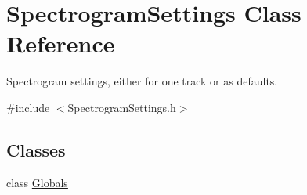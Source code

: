 \hypertarget{class_spectrogram_settings}{}\section{Spectrogram\+Settings Class Reference}
\label{class_spectrogram_settings}


Spectrogram settings, either for one track or as defaults.  




{\ttfamily \#include $<$Spectrogram\+Settings.\+h$>$}

\subsection*{Classes}
\begin{DoxyCompactItemize}
\item 
class \hyperlink{class_spectrogram_settings_1_1_globals}{Globals}
\end{DoxyCompactItemize}
